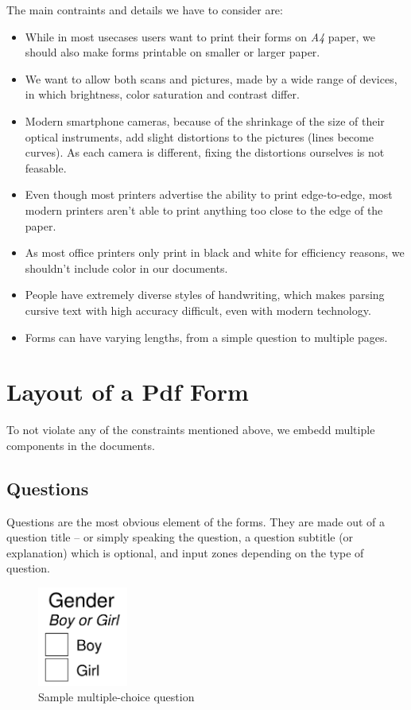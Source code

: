 \documentclass[11pt, a4paper]{report}
\begin{document}
The main contraints and details we have to consider are:
\begin{itemize}
    \item While in most usecases users want to print their forms on \textit{A4} paper, we should also make forms printable on smaller or larger paper.
    \item We want to allow both scans and pictures, made by a wide range of devices, in which brightness, color saturation and contrast differ.
    \item Modern smartphone cameras, because of the shrinkage of the size of their optical instruments, add slight distortions to the pictures (lines become curves). As each camera is different, fixing the distortions ourselves is not feasable.
    \item Even though most printers advertise the ability to print edge-to-edge, most modern printers aren't able to print anything too close to the edge of the paper.
    \item As most office printers only print in black and white for efficiency reasons, we shouldn't include color in our documents.
    \item People have extremely diverse styles of handwriting, which makes parsing cursive text with high accuracy difficult, even with modern technology.
    \item Forms can have varying lengths, from a simple question to multiple pages.
\end{itemize}

\section{Layout of a Pdf Form}

To not violate any of the constraints mentioned above, we embedd multiple components in the documents.

\subsection{Questions}

Questions are the most obvious element of the forms. They are made out of a question title -- or simply speaking the question, a question subtitle (or explanation) which is optional, and input zones depending on the type of question.

\begin{figure}[!h]
    \centering
    \includegraphics[width=8em]{images/screenshoots/sample-multiple-choice-question.png}
    \caption{Sample multiple-choice question}
    \label{fig:label}
\end{figure}
\end{document}
